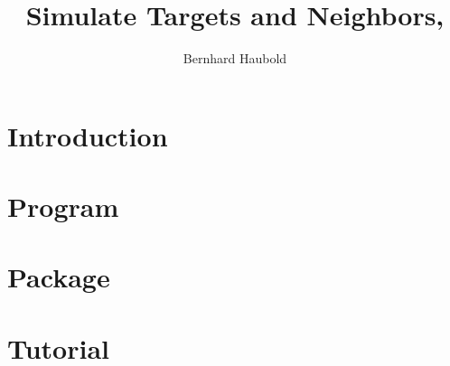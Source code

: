 \documentclass[a4paper]{report}
\begin{document}
\pagestyle{noweb}

\title{Simulate Targets and Neighbors, }
\author{Bernhard Haubold}
\maketitle
\tableofcontents
\chapter{Introduction}

\chapter{Program }

\chapter{Package }

\chapter{Tutorial}



\end{document}
